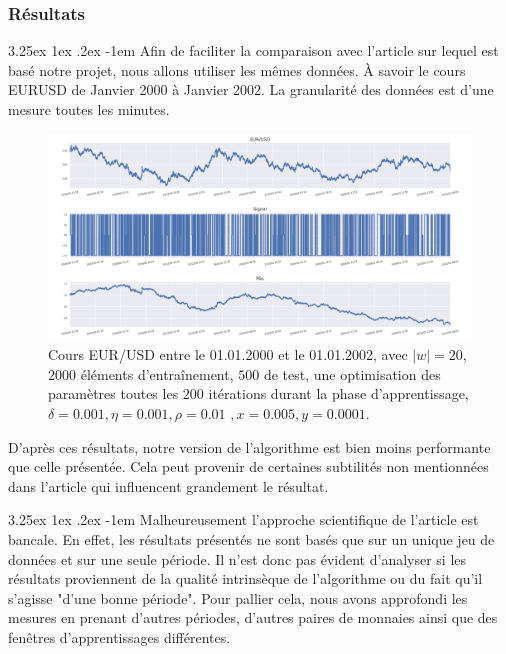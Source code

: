 \documentclass[a4paper, 11pt]{article}
\makeatletter
\renewcommand\paragraph{\@startsection{paragraph}{5}{\z@}%
  {3.25ex \@plus1ex \@minus.2ex}%
  {-1em}%
  {\normalfont\normalsize\bfseries}}
\makeatother
\begin{document}
\subsubsection{Résultats}
 \paragraph{}
 Afin de faciliter la comparaison avec l'article sur lequel est basé notre projet, nous allons utiliser les mêmes données. À savoir le cours EURUSD de Janvier 2000 à Janvier 2002. La granularité des données est d'une mesure toutes les minutes.
 
 \begin{figure}
 	\centering
 	\includegraphics[scale=0.5]{res/eursud_2000-2001}
 	\caption[Blup]{Cours EUR/USD entre le 01.01.2000 et le 01.01.2002, avec $|w| = 20$, $2000$ éléments d'entraînement, $500$ de test, une optimisation des
 		paramètres toutes les $200$ itérations durant la phase d'apprentissage, $\delta = 0.001, \eta=0.001,\rho=0.01$
 		\footnotemark$, x = 0.005, y=0.0001$.}
 \end{figure}
 \clearpage
 D'après ces résultats, notre version de l'algorithme est bien moins performante que celle présentée. Cela peut provenir de certaines subtilités non mentionnées dans l'article qui influencent grandement le résultat.
 
 \paragraph{}
 Malheureusement l'approche scientifique de l'article est bancale. En effet, les résultats présentés ne sont basés que sur un unique jeu de données et sur une seule période. Il n'est donc pas évident d'analyser si les résultats proviennent de la qualité intrinsèque de l'algorithme ou du fait qu'il s'agisse "d'une bonne période". Pour pallier cela, nous avons approfondi les mesures en prenant d'autres périodes, d'autres paires de monnaies ainsi que des fenêtres d'apprentissages différentes.
 
\end{document}
